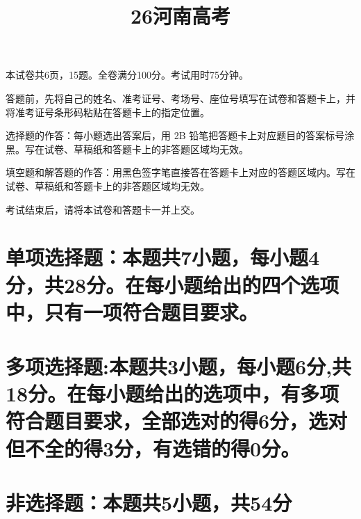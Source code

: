 \documentclass{exam-zh}
\title{26河南高考}
\begin{document}

\secret

\maketitle
  本试卷共6页，15题。全卷满分100分。考试用时75分钟。

\begin{notice}
  \item 答题前，先将自己的姓名、准考证号、考场号、座位号填写在试卷和答题卡上，并将准考证号条形码粘贴在答题卡上的指定位置。
  \item 选择题的作答：每小题选出答案后，用 2B 铅笔把答题卡上对应题目的答案标号涂黑。写在试卷、草稿纸和答题卡上的非答题区域均无效。
  \item 填空题和解答题的作答：用黑色签字笔直接答在答题卡上对应的答题区域内。写在试卷、草稿纸和答题卡上的非答题区域均无效。
  \item 考试结束后，请将本试卷和答题卡一并上交。
\end{notice}

\section{%
	单项选择题：本题共7小题，每小题4分，共28分。在每小题给出的四个选项中，只有一项符合题目要求。}
\begin{question}
	
\end{question}


\section{%
	多项选择题:本题共3小题，每小题6分,共18分。在每小题给出的选项中，有多项符合题目要求，全部选对的得6分，选对但不全的得3分，有选错的得0分。}



\section{%
		非选择题：本题共5小题，共54分}
	
\end{document}
